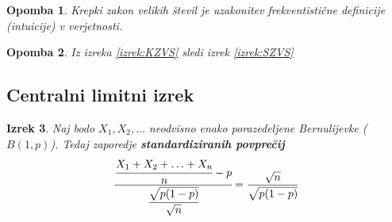 \documentclass[11pt]{article}
\newtheorem{Izrek}{{\sc Izrek}}[section]
\newtheorem{Opomba}[Izrek]{{\sc Opomba}}
\begin{document}
	\begin{Opomba}
		Krepki zakon velikih števil je uzakonitev frekventistične definicije (intuicije) v verjetnosti.
	\end{Opomba}
	\begin{Opomba}
		Iz izreka \ref{izrek:KZVS} sledi izrek \ref{izrek:SZVS}
	\end{Opomba}
	\subsection{Centralni limitni izrek}
	\begin{Izrek}
		Naj bodo $X_1, X_2, \ldots$ neodvisno enako porazedeljene Bernulijevke ($B(1,p)$). Tedaj zaporedje \textbf{standardiziranih povprečij}
		\begin{equation}
		\cfrac{\cfrac{X_1+X_2 + \ldots + X_n}{n} - p}{ \cfrac{\sqrt{p(1-p)}}{ \sqrt{n} } }  = \frac{\sqrt{n}}{\sqrt{p(1-p)}}$$
		\end{equation}
	\end{Izrek}
	
\end{document}

